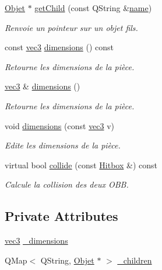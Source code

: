 \begin{DoxyCompactItemize}
\hyperlink{class_objet}{Objet} $\ast$ \hyperlink{class_piece_aa77dc9ed8493cc22d1455c3eb2bec013}{get\+Child} (const Q\+String \&\hyperlink{class_objet_a4a702c189bedcbf1e65da6aec72c8e44}{name})
\begin{DoxyCompactList}\small\item\em Renvoie un pointeur sur un objet fils. \end{DoxyCompactList}\item 
const \hyperlink{structvec3}{vec3} \hyperlink{class_piece_ab522c715b4dd27b0789f5aed218ab59d}{dimensions} () const 
\begin{DoxyCompactList}\small\item\em Retourne les dimensions de la pièce. \end{DoxyCompactList}\item 
\hyperlink{structvec3}{vec3} \& \hyperlink{class_piece_a3f5440ec22866d79a26a513470744412}{dimensions} ()
\begin{DoxyCompactList}\small\item\em Retourne les dimensions de la pièce. \end{DoxyCompactList}\item 
void \hyperlink{class_piece_a4419c3b0a9e57dcd215dd87be025752f}{dimensions} (const \hyperlink{structvec3}{vec3} v)
\begin{DoxyCompactList}\small\item\em Edite les dimensions de la pièce. \end{DoxyCompactList}\item 
virtual bool \hyperlink{class_piece_a7b433182fab60a55c1b8dda976c015cc}{collide} (const \hyperlink{class_hitbox}{Hitbox} \&) const 
\begin{DoxyCompactList}\small\item\em Calcule la collision des deux O\+B\+B. \end{DoxyCompactList}\end{DoxyCompactItemize}
\subsection*{Private Attributes}
\begin{DoxyCompactItemize}
\item 
\hyperlink{structvec3}{vec3} \hyperlink{class_piece_a47a3458694b894041bd95a1666c9bf3d}{\+\_\+dimensions}
\item 
Q\+Map$<$ Q\+String, \hyperlink{class_objet}{Objet} $\ast$ $>$ \hyperlink{class_piece_ac80078a597e7edcd297895bab25731e6}{\+\_\+children}
\end{DoxyCompactItemize}
